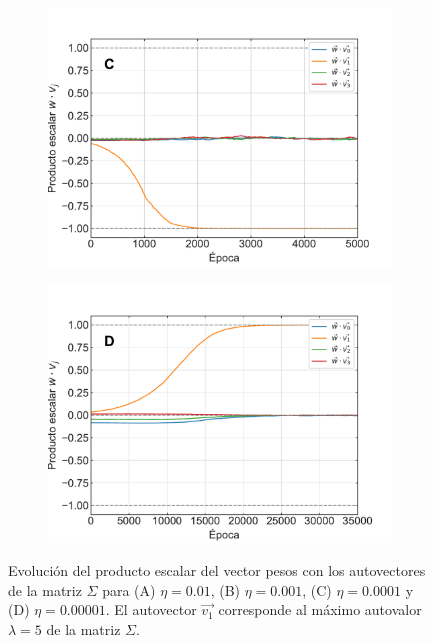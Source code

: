 \documentclass[11pt,twocolumn,twoside]{opticajnl}
\begin{document}
\begin{figure}[h]
\begin{subfigure}[b]{0.49\linewidth}
         \end{subfigure}
         \begin{subfigure}[b]{0.49\linewidth}
            \centering
            \includegraphics[width=1.1\textwidth]{Figuras/prodesc_lr_0.0001.pdf}
         \end{subfigure}
         \begin{subfigure}[b]{0.49\linewidth}
            \centering
            \includegraphics[width=1.1\textwidth]{Figuras/prodesc_lr_1e-05.pdf}
         \end{subfigure}
    \caption{Evolución del producto escalar del vector pesos con los autovectores de la matriz $\Sigma$ para (A) $\eta=0.01$, (B) $\eta=0.001$, (C) $\eta=0.0001$ y (D) $\eta=0.00001$. El autovector $\vec{v_1}$ corresponde al máximo autovalor $\lambda = 5$ de la matriz $\Sigma$.} 
    \label{fig:prodesc_epocas}
\end{figure}
\end{document}
